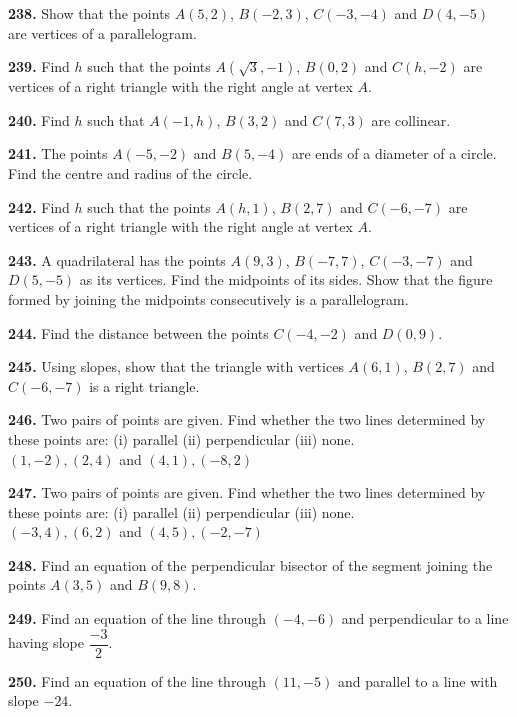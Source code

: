 \documentclass[11pt]{article}
\begin{document}
\bigskip
\noindent\textbf{238.} Show that the points $A(5,2)$, $B(-2,3)$, $C(-3,-4)$ and $D(4,-5)$ are vertices of a parallelogram.

\bigskip
\noindent\textbf{239.} Find $h$ such that the points $A(\sqrt{3}, -1)$, $B(0,2)$ and $C(h,-2)$ are vertices of a right triangle with the right angle at vertex $A$.

\bigskip
\noindent\textbf{240.} Find $h$ such that $A(-1,h)$, $B(3,2)$ and $C(7,3)$ are collinear.

\bigskip
\noindent\textbf{241.} The points $A(-5,-2)$ and $B(5,-4)$ are ends of a diameter of a circle. Find the centre and radius of the circle.

\bigskip
\noindent\textbf{242.} Find $h$ such that the points $A(h,1)$, $B(2,7)$ and $C(-6,-7)$ are vertices of a right triangle with the right angle at vertex $A$.

\bigskip
\noindent\textbf{243.} A quadrilateral has the points $A(9,3)$, $B(-7,7)$, $C(-3,-7)$ and $D(5,-5)$ as its vertices. Find the midpoints of its sides. Show that the figure formed by joining the midpoints consecutively is a parallelogram.

\bigskip
\noindent\textbf{244.} Find the distance between the points $C(-4,-2)$ and $D(0,9)$.

\bigskip
\noindent\textbf{245.} Using slopes, show that the triangle with vertices $A(6,1)$, $B(2,7)$ and $C(-6,-7)$ is a right triangle.

\bigskip
\noindent\textbf{246.} Two pairs of points are given. Find whether the two lines determined by these points are: (i) parallel (ii) perpendicular (iii) none. \\
$(1,-2), (2,4)$ and $(4,1), (-8,2)$

\bigskip
\noindent\textbf{247.} Two pairs of points are given. Find whether the two lines determined by these points are: (i) parallel (ii) perpendicular (iii) none. \\
$(-3,4), (6,2)$ and $(4,5), (-2,-7)$

\bigskip
\noindent\textbf{248.} Find an equation of the perpendicular bisector of the segment joining the points $A(3,5)$ and $B(9,8)$.

\bigskip
\noindent\textbf{249.} Find an equation of the line through $(-4,-6)$ and perpendicular to a line having slope $\dfrac{-3}{2}$.

\bigskip
\noindent\textbf{250.} Find an equation of the line through $(11,-5)$ and parallel to a line with slope $-24$.
\end{document}
